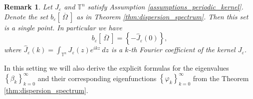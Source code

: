 \documentclass[12pt, a4paper]{article}
\theoremstyle{break}
\theoremstyle{break}
\theoremstyle{break}
\newtheorem{rem}{Remark}[section]
\theoremstyle{break}
\theoremstyle{break}
\newcommand{\Seq}[2]{\left\{#1_#2\right\}_{#2 = 0}^\infty}
\begin{document}
\begin{rem}
    Let $J_\varepsilon$ and $\mathbb{T}^n$ satisfy Assumption \ref{assumptions_periodic_kernel}. Denote the set $b_\varepsilon \left[\: \overline{\Omega} \:\right]$ as in Theorem \ref{thm:dispersion_spectrum}. Then this set is a single point. In particular we have
    $$b_\varepsilon \left[\: \overline{\Omega} \:\right] = \left\{ - \hat{J}_\varepsilon(0) \right\},$$
    where $\hat{J}_\varepsilon(k) = \int_{\mathbb{T}^n} J_\varepsilon(z) e^{ikz}\:dz$ is a $k$-th Fourier coefficient of the kernel $J_\varepsilon$. \label{rem:dispersion_periodic_spectrum}
\end{rem}
In this setting we will also derive the explicit formulas for the eigenvalues $\Seq{\beta}{k}$ and their corresponding eigenfunctions $\Seq{\varphi}{k}$ from the Theorem \ref{thm:dispersion_spectrum}.
\end{document}
